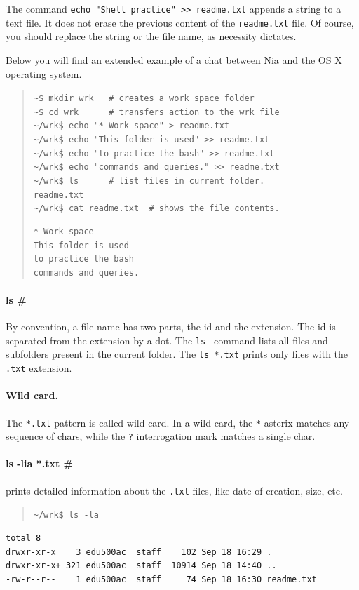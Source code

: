 \documentclass[a4paper,12pt]{book}
\begin{document}
The command \verb|echo "Shell practice" >> readme.txt|
appends a string to a text file. It does
not erase the previous content of
the \verb|readme.txt| file. Of course,
you should replace the string or the
file name, as necessity dictates.


Below you will find
an extended example of a chat between Nia and
the OS X operating system.
\begin{quote}
\verb|~$ mkdir wrk   # creates a work space folder      | \\
\verb|~$ cd wrk      # transfers action to the wrk file | \\
\verb|~/wrk$ echo "* Work space" > readme.txt | \\
\verb|~/wrk$ echo "This folder is used" >> readme.txt |\\
\verb|~/wrk$ echo "to practice the bash" >> readme.txt | \\
\verb|~/wrk$ echo "commands and queries." >> readme.txt | \\
\verb|~/wrk$ ls      # list files in current folder. | \\
\verb|readme.txt |\\
\verb|~/wrk$ cat readme.txt  # shows the file contents.| 
\begin{verbatim}
* Work space
This folder is used
to practice the bash
commands and queries.
\end{verbatim}
\end{quote}

\paragraph{ls \#} 
By convention, a file name has
two parts, the id and the extension. The id
is separated from the extension by a dot.
The \verb|ls | command lists all files
and subfolders present in the current folder.
The \verb|ls *.txt| prints only files
with the \verb|.txt| extension.

\paragraph{Wild card.} The 
\verb|*.txt| pattern
is called wild card.
In a wild card, the \verb|*| asterix matches
any sequence of chars, while the \verb|?|
interrogation mark matches a single char.

\paragraph{ls -lia *.txt \#} prints detailed
information about the \verb|.txt| files,
like date of creation, size, etc.
\begin{quote}
\verb|~/wrk$ ls -la |  
\end{quote}
\begin{verbatim}
total 8
drwxr-xr-x    3 edu500ac  staff    102 Sep 18 16:29 .
drwxr-xr-x+ 321 edu500ac  staff  10914 Sep 18 14:40 ..
-rw-r--r--    1 edu500ac  staff     74 Sep 18 16:30 readme.txt
\end{verbatim}
\end{document}

